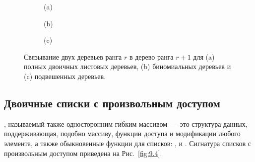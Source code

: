 \begin{frame}[fragile]{}

\begin{figure}
  \centering
  \begin{subfigure}[b]{0.45\textwidth}
    \centering
    \par\vspace{0.2cm}
    (a)
  \end{subfigure}
  \begin{subfigure}[b]{0.45\textwidth}
    \centering
    \par\vspace{0.2cm}
    (b)
  \end{subfigure}\par\vspace{0.2cm}
  \begin{subfigure}[b]{1\textwidth}
    \centering
    \par\vspace{0.2cm}
    (c)
  \end{subfigure}

  \caption{Связывание двух деревьев ранга $r$ в дерево ранга $r+1$ для
    (a) полных двоичных листовых деревьев, (b) биномиальных деревьев и
    (c) подвешенных деревьев.}
  \label{fig:9.3}
\end{figure}

\end{frame}

\begin{comment}
В предыдущих главах мы уже видели несколько реализаций куч,
основанных на двоичной арифметике и биномиальных деревьях. Теперь мы
сначала рассмотрим простое числовое представление для списков с
произвольным доступом. Затем мы исследуем насколько вариаций двоичной
арифметики, позволяющих улучшить асимптотические показатели.
\end{comment}

\subsection{Двоичные списки с произвольным доступом}
\label{sc:9.2.1}

\begin{frame}[fragile]{}
, называемый
также односторонним гибким массивом~--- это структура данных,
поддерживающая, подобно массиву, функции доступа и модификации любого
элемента, а также обыкновенные функции для списков: ,
 и . Сигнатура списков с произвольным
доступом приведена на Рис.~\ref{fig:9.4}.

%
\inputminted[firstline=4]{haskell}{code/RandomAccessList.lhs}
\end{frame}

